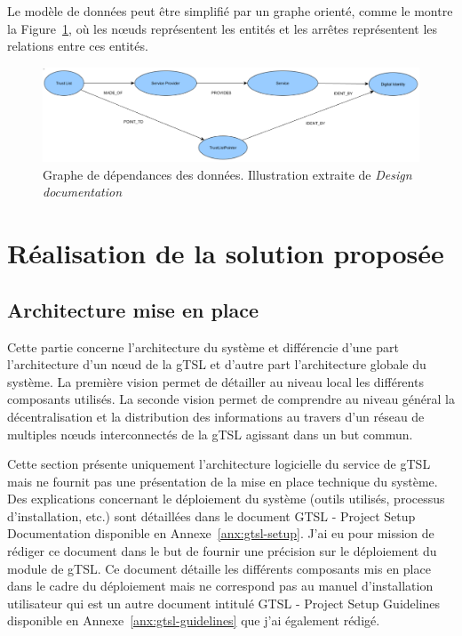 \documentclass{tnreport}
\begin{document}
Le modèle de données peut être simplifié par un graphe orienté, comme le montre la Figure~\ref{fig:dependencies}, où les nœuds représentent les entités et les arrêtes représentent les relations entre ces entités.

\begin{figure}[h]
	\centering
	\includegraphics[scale=0.42]{figures/dependencies}
	\caption{Graphe de dépendances des données. Illustration extraite de \textit{Design documentation}~\cite{design-document}}
	\label{fig:dependencies}
\end{figure}

\chapter{Réalisation de la solution proposée}
\label{sec:realisation}

\section{Architecture mise en place}
\label{sec:architecture}

Cette partie concerne l'architecture du système et différencie d'une part l'architecture d'un nœud de la gTSL et d'autre part l'architecture globale du système. La première vision permet de détailler au niveau local les différents composants utilisés. La seconde vision permet de comprendre au niveau général la décentralisation et la distribution des informations au travers d'un réseau de multiples nœuds interconnectés de la gTSL agissant dans un but commun.

Cette section présente uniquement l'architecture logicielle du service de gTSL mais ne fournit pas une présentation de la mise en place technique du système. Des explications concernant le déploiement du système (outils utilisés, processus d'installation, etc.) sont détaillées dans le document GTSL - Project Setup Documentation disponible en Annexe~\ref{anx:gtsl-setup}. J'ai eu pour mission de rédiger ce document dans le but de fournir une précision sur le déploiement du module de gTSL. Ce document détaille les différents composants mis en place dans le cadre du déploiement mais ne correspond pas au manuel d'installation utilisateur qui est un autre document intitulé GTSL - Project Setup Guidelines disponible en Annexe~\ref{anx:gtsl-guidelines} que j'ai également rédigé.
\end{document}
